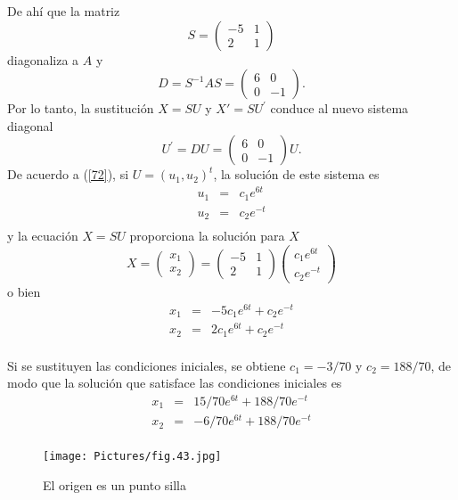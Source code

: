  De ahí que la matriz 
\[
 S=\left(\begin{array}{cc} -5& 1  \\2 & 1 
\end{array}
 \right)
  \]
diagonaliza a $A$ y 
\[
 D=S^{-1}A S=\left(\begin{array}{cc} 6& 0  \\0 & -1 
\end{array}
 \right).
  \]
  Por lo tanto, la sustitución $X=SU$ y $X'=SU^\prime$
  conduce al nuevo sistema diagonal
  \[
 U^\prime=DU=\left(\begin{array}{cc} 6& 0  \\0 & -1 
\end{array}
 \right)U.
  \]
 De acuerdo a (\ref{72}), si $U=(u_1,u_2)^t$, la solución de este sistema es 
 \begin{eqnarray*}
  u_1&=&c_1e^{6t} \nonumber\\
  u_2&=&c_2e^{-t}\nonumber\\
\end{eqnarray*} 
  y la ecuación $X=SU$ proporciona la solución para $X$
 \[
 X=  \left(\begin{array}{c} x_1  \\x_2 
\end{array}
 \right) =            \left(\begin{array}{cc} -5 & 1  \\2 & 1 
\end{array}
 \right) \left(\begin{array}{c} c_1e^{6t}  \\c_2e^{-t}
\end{array}
 \right)    
  \]
o bien
\begin{eqnarray*}
  x_1&=&-5 c_1e^{6t}+ c_2e^{-t} \nonumber\\
  x_2&=&2 c_1e^{6t}+ c_2e^{-t}\nonumber\\
\end{eqnarray*} 
  
Si se sustituyen las condiciones iniciales, se obtiene $c_1 = −3/70$  y $c_2 = 188/70$,
de modo que la solución que satisface las condiciones iniciales es 
\begin{eqnarray*}
  x_1&=&15/70e^{6t}+ 188/70e^{-t} \nonumber\\
  x_2&=&-6/70e^{6t}+ 188/70e^{-t}\nonumber\\
\end{eqnarray*} 


\begin{figure}
    \centering
    \texttt{[image: Pictures/fig.43.jpg]}
    \caption{El origen es un punto silla}
    \label{357}
\end{figure} 

